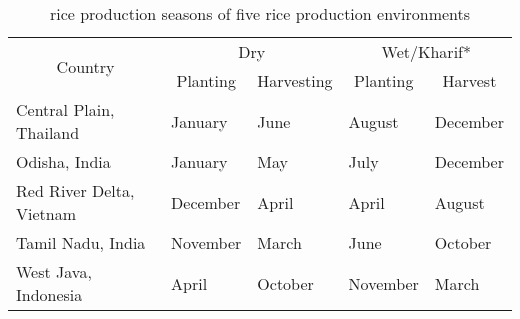 \begin{table}
\centering
\caption{rice production seasons of five rice production environments}
\label{table:riceproduction_season}
\begin{tabular}{lllll}
\hline
\multicolumn{1}{c}{\multirow{2}{*}{Country}} & \multicolumn{2}{c}{Dry}                                       & \multicolumn{2}{c}{Wet/Kharif*}                            \\
\cline{2-5}
\multicolumn{1}{c}{}                         & \multicolumn{1}{c}{Planting} & \multicolumn{1}{c}{Harvesting} & \multicolumn{1}{c}{Planting} & \multicolumn{1}{c}{Harvest} \\
\hline
Central Plain, Thailand                                     & January                      & June                           & August                       & December                    \\
Odisha, India                                        & January                     & May                            & July                          & December                     \\
Red River Delta, Vietnam                                      & December                     & April                          & April                        & August      \\
Tamil Nadu, India                                        & November                     & March                            & June                          & October                     \\
West Java, Indonesia                                    & April                        & October                        & November                     & March                       \\
\hline               
\end{tabular}
\end{table}